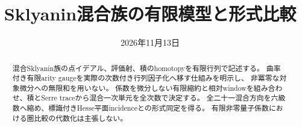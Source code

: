 \documentclass[11pt,a4paper]{ltjsarticle}
\title{Sklyanin混合族の有限模型と形式比較}
\date{2026年11月13日}
\begin{document}
\maketitle
\begin{abstract}
混合Sklyanin族の点イデアル、評価射、積のhomotopyを有限行列で記述する。
曲率付き有限arity gaugeを実際の次数付き行列因子化へ移す仕組みを明示し、
非冪零な対象微分への無限和を用いない。
係数を微分しない有限縮約と相対windowを組み合わせ、積とSerre traceから混合一次単元を全次数で決定する。
全二十一混合方向を六級数へ縮め、標識付きHesse平面incidenceとの形式同定を得る。
有限非零量子係数における圏比較の代数化は主張しない。
\end{abstract}










\end{document}
